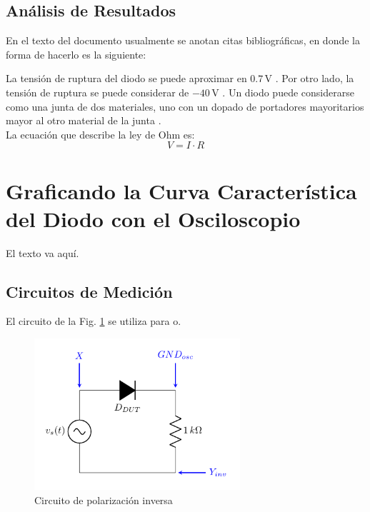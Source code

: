 \documentclass[journal]{IEEEtran}
\begin{document}
\subsection{Análisis de Resultados}
En el texto del documento usualmente se anotan citas bibliográficas, en donde la forma de hacerlo es la siguiente:


La tensión de ruptura del diodo se puede aproximar en $0.7\,$V \cite{Malik1996,Boylestad,Horowitz1989,Gray1995}. Por otro lado, la tensión de ruptura se puede considerar de $-40\,$V \cite{Floyd2008,Behzad2013,Schilling1994}. Un diodo puede considerarse como una junta de dos materiales, uno con un dopado de portadores mayoritarios mayor al otro material de la junta \cite{Pierret1994}.\\


La ecuación que describe la ley de Ohm es:
\begin{equation}
	V=I\cdot R
\end{equation}

\section{Graficando la Curva Característica del Diodo con el Osciloscopio}
El texto va aquí.

\subsection{Circuitos de Medición}
El circuito de la Fig. \ref{fig_cir2} se utiliza para o.

\begin{figure}[!ht]
\centering
\includegraphics[width=3in]{circuito_3}
\caption{Circuito de polarización inversa}
\label{fig_cir2}
\end{figure}
\end{document}
